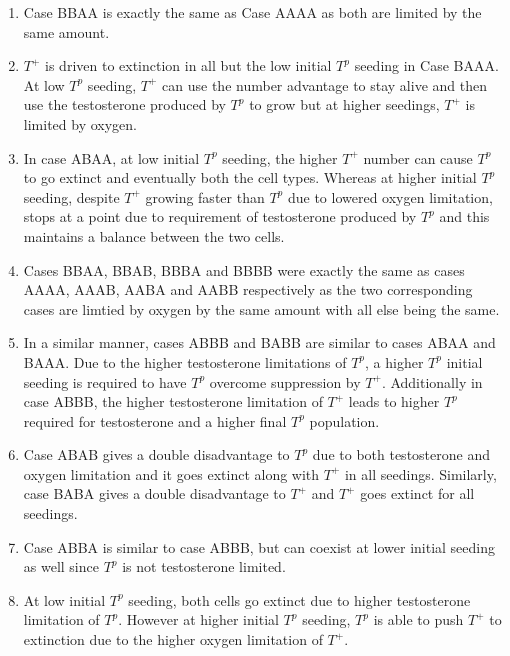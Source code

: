 \begin{enumerate}
  \item Case BBAA is exactly the same as Case AAAA as both are limited by the same amount.
  \item $T^+$ is driven to extinction in all but the low initial $T^p$ seeding in Case BAAA. At low $T^p$ seeding, $T^+$ can use the number advantage to stay alive and then use the testosterone produced by $T^p$ to grow but at higher seedings, $T^+$ is limited by oxygen.
  \item In case ABAA, at low initial $T^p$ seeding, the higher $T^+$ number can cause $T^p$ to go extinct and eventually both the cell types. Whereas at higher initial $T^p$ seeding, despite $T^+$ growing faster than $T^p$ due to lowered oxygen limitation, stops at a point due to requirement of testosterone produced by $T^p$ and this maintains a balance between the two cells.
  \item Cases BBAA, BBAB, BBBA and BBBB were exactly the same as cases AAAA, AAAB, AABA and AABB respectively as the two corresponding cases are limtied by oxygen by the same amount with all else being the same.
  \item In a similar manner, cases ABBB and BABB are similar to cases ABAA and BAAA. Due to the higher testosterone limitations of $T^p$, a higher $T^p$ initial seeding is required to have $T^p$ overcome suppression by $T^+$. Additionally in case ABBB, the higher testosterone limitation of $T^+$ leads to higher $T^p$ required for testosterone and a higher final $T^p$ population.
  \item Case ABAB gives a double disadvantage to $T^p$ due to both testosterone and oxygen limitation and it goes extinct along with $T^+$ in all seedings. Similarly, case BABA gives a double disadvantage to $T^+$ and $T^+$ goes extinct for all seedings.
  \item Case ABBA is similar to case ABBB, but can coexist at lower initial seeding as well since $T^p$ is not testosterone limited.
  \item At low initial $T^p$ seeding, both cells go extinct due to higher testosterone limitation of $T^p$. However at higher initial $T^p$ seeding, $T^p$ is able to push $T^+$ to extinction due to the higher oxygen limitation of $T^+$.
\end{enumerate}

